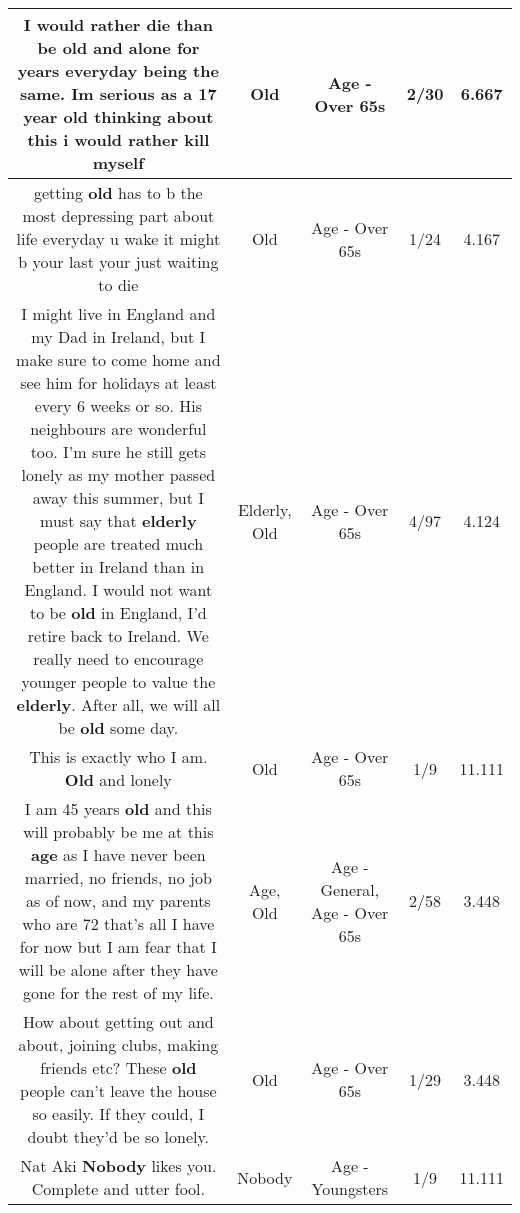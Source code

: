 \documentclass[11pt]{article}
\newlength\mylength
\begin{document}
\begin{center}
\begin{longtable}{|C{.65\mylength}|C{.30\mylength}|C{.12\mylength}|C{.12\mylength}|C{.12\mylength}|}
  \small I would rather die than be \textbf{old} and alone for years everyday being the same. Im serious as a 17 year \textbf{old} thinking about this i would rather kill myself\normalsize   & Old & Age - Over 65s & 2/30 & 6.667 \\  \hline
  \small getting \textbf{old} has to b the most depressing part about life everyday u wake it might b your last your just waiting to die\normalsize   & Old & Age - Over 65s & 1/24 & 4.167 \\  \hline
  \small I might live in England and my Dad in Ireland, but I make sure to come home and see him for holidays at least every 6 weeks or so. His neighbours are wonderful too. I'm sure he still gets lonely as my mother passed away this summer, but I must say that \textbf{elderly} people are treated much better in Ireland than in England. I would not want to be \textbf{old} in England, I'd retire back to Ireland. We really need to encourage younger people to value the \textbf{elderly}. After all, we will all be \textbf{old} some day.\normalsize   & Elderly, Old & Age - Over 65s & 4/97 & 4.124 \\  \hline
  \small This is exactly who I am. \textbf{Old} and lonely\normalsize   & Old & Age - Over 65s & 1/9 & 11.111 \\  \hline
  \small I am 45 years \textbf{old} and this will probably be me at this \textbf{age} as I have never been married, no friends, no job as of now, and my parents who are 72  that's all I have for now but I am fear that I will be alone after they have gone for the rest of my life.\normalsize   & Age, Old & Age - General, Age - Over 65s & 2/58 & 3.448 \\  \hline
  \small How about getting out and about, joining clubs, making friends etc? These \textbf{old} people can't leave the house so easily. If they could, I doubt they'd be so lonely.\normalsize   & Old & Age - Over 65s & 1/29 & 3.448 \\  \hline
  \small Nat Aki \textbf{Nobody} likes you. Complete and utter fool.\normalsize   & Nobody & Age - Youngsters & 1/9 & 11.111 \\  \hline

\end{longtable}
\end{center}
\end{document}
